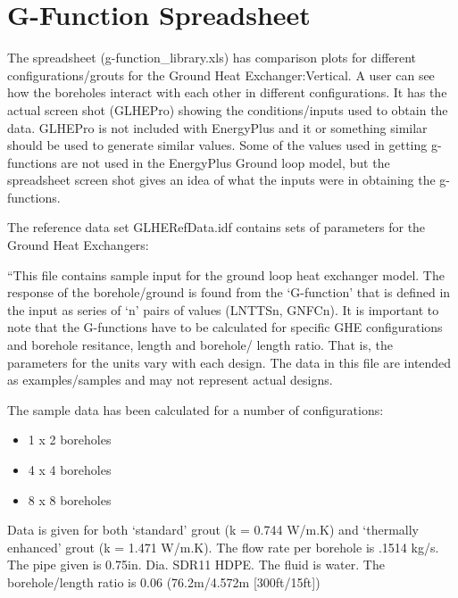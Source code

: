 \section{G-Function Spreadsheet}\label{g-function-spreadsheet}

The spreadsheet (g-function\_library.xls) has comparison plots for different configurations/grouts for the Ground Heat Exchanger:Vertical. A user can see how the boreholes interact with each other in different configurations. It has the actual screen shot (GLHEPro) showing the conditions/inputs used to obtain the data. GLHEPro is not included with EnergyPlus and it or something similar should be used to generate similar values. Some of the values used in getting g-functions are not used in the EnergyPlus Ground loop model, but the spreadsheet screen shot gives an idea of what the inputs were in obtaining the g-functions.

The reference data set GLHERefData.idf contains sets of parameters for the Ground Heat Exchangers:

``This file contains sample input for the ground loop heat exchanger model. The response of the borehole/ground is found from the `G-function' that is defined in the input as series of `n' pairs of values (LNTTSn, GNFCn). It is important to note that the G-functions have to be calculated for specific GHE configurations and borehole resitance, length and borehole/ length ratio. That is, the parameters for the units vary with each design. The data in this file are intended as examples/samples and may not represent actual designs.

The sample data has been calculated for a number of configurations:

\begin{itemize}
\item
  1 x 2 boreholes
\item
  4 x 4 boreholes
\item
  8 x 8 boreholes
\end{itemize}

Data is given for both `standard' grout (k = 0.744 W/m.K) and `thermally enhanced' grout (k = 1.471 W/m.K). The flow rate per borehole is .1514 kg/s. The pipe given is 0.75in. Dia. SDR11 HDPE. The fluid is water. The borehole/length ratio is 0.06 (76.2m/4.572m {[}300ft/15ft{]})
